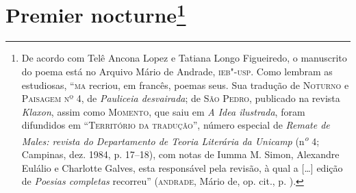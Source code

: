 \chapter{Premier nocturne\footnote[*]{De acordo com Telê Ancona Lopez e
  Tatiana Longo Figueiredo, o manuscrito do poema está no Arquivo Mário
  de Andrade, \textsc{ieb"-usp}. Como lembram as estudiosas, ``\textsc{ma} recriou, em
  francês, poemas seus. Sua tradução de \textsc{Noturno} e
  \textsc{Paisagem nº 4,} de \emph{Pauliceia desvairada}; de \textsc{São
  Pedro,} publicado na revista \emph{Klaxon}, assim como
  \textsc{Momento}, que saiu em \emph{A Idea ilustrada}, foram
  difundidos em ``\textsc{Território da tradução}'', número especial de
  \emph{Remate de Males: revista do Departamento de Teoria Literária da
  Unicamp} (n\textsuperscript{\emph{o}} 4; Campinas, dez. 1984, p.
  17--18), com notas de Iumma M. Simon, Alexandre Eulálio e Charlotte
  Galves, esta responsável pela revisão, à qual a {[}\ldots{}{]} edição de
  \emph{Poesias completas} recorreu'' (\textsc{andrade}, Mário de, op. cit., p.
  ).}}

